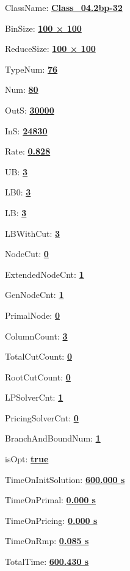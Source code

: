 \documentclass[11pt]{article}
\begin{document}
\pagestyle{empty}


ClassName: \underline{\textbf{Class_04.2bp-32}}
\par
BinSize: \underline{\textbf{100 × 100}}
\par
ReduceSize: \underline{\textbf{100 × 100}}
\par
TypeNum: \underline{\textbf{76}}
\par
Num: \underline{\textbf{80}}
\par
OutS: \underline{\textbf{30000}}
\par
InS: \underline{\textbf{24830}}
\par
Rate: \underline{\textbf{0.828}}
\par
UB: \underline{\textbf{3}}
\par
LB0: \underline{\textbf{3}}
\par
LB: \underline{\textbf{3}}
\par
LBWithCut: \underline{\textbf{3}}
\par
NodeCut: \underline{\textbf{0}}
\par
ExtendedNodeCnt: \underline{\textbf{1}}
\par
GenNodeCnt: \underline{\textbf{1}}
\par
PrimalNode: \underline{\textbf{0}}
\par
ColumnCount: \underline{\textbf{3}}
\par
TotalCutCount: \underline{\textbf{0}}
\par
RootCutCount: \underline{\textbf{0}}
\par
LPSolverCnt: \underline{\textbf{1}}
\par
PricingSolverCnt: \underline{\textbf{0}}
\par
BranchAndBoundNum: \underline{\textbf{1}}
\par
isOpt: \underline{\textbf{true}}
\par
TimeOnInitSolution: \underline{\textbf{600.000 s}}
\par
TimeOnPrimal: \underline{\textbf{0.000 s}}
\par
TimeOnPricing: \underline{\textbf{0.000 s}}
\par
TimeOnRmp: \underline{\textbf{0.085 s}}
\par
TotalTime: \underline{\textbf{600.430 s}}
\par
\newpage
\end{document}
